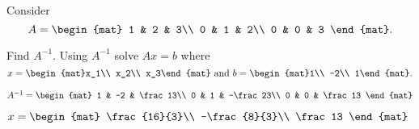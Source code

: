 
\begin{Exercise}[
name={},
title={}, 
difficulty=0,
origin={\cite{YL}}]
Consider
\[
A=
\begin{mat}
1 & 2 & 3\\
0 & 1 & 2\\
0 & 0 & 3
\end{mat}.
\]

\Question Find $A^{-1}$.
\Question Using $A^{-1}$ solve $Ax=b$ where
\[
x=\begin{mat}x_1\\ x_2\\ x_3\end{mat}\text{ and }b=\begin{mat}1\\ -2\\ 1\end{mat}.
\]


\end{Exercise}

\begin{Answer}
\Question
$
A^{-1} = 
\begin{mat}
1 & -2 & \frac13\\
0 & 1 & -\frac23\\
0 & 0 & \frac13
\end{mat}
$

\Question
$
x = 
\begin{mat}
\frac{16}{3}\\
-\frac{8}{3}\\
\frac13
\end{mat}
$
\end{Answer}
